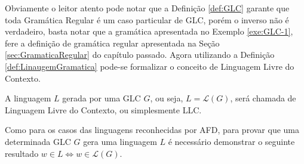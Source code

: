 Obviamente o leitor atento pode notar que a Definição \ref{def:GLC} garante que toda Gramática Regular é um caso particular de GLC, porém o inverso não é verdadeiro, basta notar que a gramática apresentada no Exemplo \ref{exe:GLC-1}, fere a definição de gramática regular apresentada na Seção \ref{sec:GramaticaRegular} do capítulo passado. Agora utilizando a Definição \ref{def:LinaugemGramatica} pode-se formalizar o conceito de Linguagem Livre do Contexto.

\begin{definition}\label{def:LLC}
	A linguagem $L$ gerada por uma GLC $G$, ou seja, $L = \mathcal{L}(G)$, será chamada de Linguagem Livre do Contexto, ou simplesmente LLC.
\end{definition}

Como para os casos das linguagens reconhecidas por AFD, para provar que uma determinada GLC $G$ gera uma linguagem $L$ é necessário demonstrar o seguinte resultado $w \in L \Longleftrightarrow w \in \mathcal{L}(G)$.

